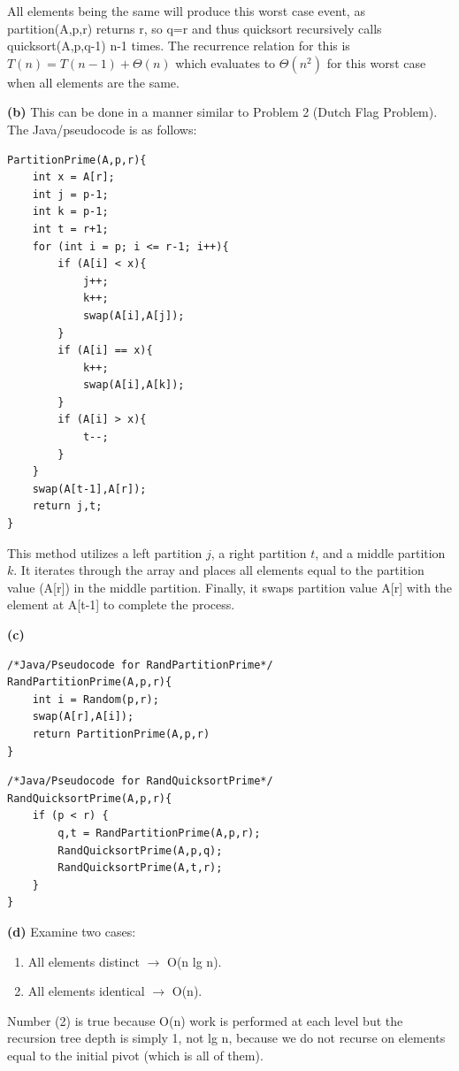 \documentclass[11pt]{article}
\renewcommand\part[1]{\vspace{.10in}\textbf{(#1)}}
\begin{document}
All elements being the same will produce this worst case event, as partition(A,p,r) returns r, so q=r and thus quicksort recursively calls quicksort(A,p,q-1) n-1 times. The recurrence relation for this is $T(n) = T(n-1) + \Theta(n)$ which evaluates to $\Theta(n^2)$ for this worst case when all elements are the same.

\part{b}
This can be done in a manner similar to Problem 2 (Dutch Flag Problem). The Java/pseudocode is as follows:

\begin{lstlisting}
PartitionPrime(A,p,r){
	int x = A[r];
	int j = p-1;
	int k = p-1;
	int t = r+1;
	for (int i = p; i <= r-1; i++){
		if (A[i] < x){
			j++;
			k++;
			swap(A[i],A[j]);
		}
		if (A[i] == x){
			k++;
			swap(A[i],A[k]);
		}
		if (A[i] > x){
			t--;
		}
	}
	swap(A[t-1],A[r]);
	return j,t;
}
\end{lstlisting}

This method utilizes a left partition $j$, a right partition $t$, and a middle partition $k$. It iterates through the array and places all elements equal to the partition value (A[r]) in the middle partition. Finally, it swaps partition value A[r] with the element at A[t-1] to complete the process.

\part{c}
\begin{lstlisting}
/*Java/Pseudocode for RandPartitionPrime*/
RandPartitionPrime(A,p,r){
	int i = Random(p,r);
	swap(A[r],A[i]);
	return PartitionPrime(A,p,r)
}
\end{lstlisting}

\begin{lstlisting}
/*Java/Pseudocode for RandQuicksortPrime*/
RandQuicksortPrime(A,p,r){
	if (p < r) {
		q,t = RandPartitionPrime(A,p,r);
		RandQuicksortPrime(A,p,q);
		RandQuicksortPrime(A,t,r);	
	}
}
\end{lstlisting}

\part{d}
Examine two cases:
\begin{enumerate}
	\item All elements distinct $\rightarrow$ O(n lg n).
	\item All elements identical $\rightarrow$ O(n).
\end{enumerate}
Number (2) is true because O(n) work is performed at each level but the recursion tree depth is simply 1, not lg n, because we do not recurse on elements equal to the initial pivot (which is all of them).
\end{document}
